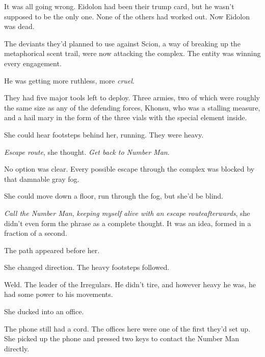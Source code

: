 It was all going wrong.  Eidolon had been their trump card, but he wasn't supposed to be the only one.  None of the others had worked out.  Now Eidolon was dead.



The deviants they'd planned to use against Scion, a way of breaking up the metaphorical scent trail, were now attacking the complex.  The entity was winning every engagement.



He was getting more ruthless, more \emph{cruel}.



They had five major tools left to deploy.  Three armies, two of which were roughly the same size as any of the defending forces, Khonsu, who was a stalling measure, and a hail mary in the form of the three vials with the special element inside.



She could hear footsteps behind her, running.  They were heavy.



\emph{Escape route}, she thought.  \emph{Get back to Number Man}.



No option was clear.  Every possible escape through the complex was blocked by that damnable gray fog.



She could move down a floor, run through the fog, but she'd be blind.



\emph{Call the Number Man}, \emph{keeping myself alive with an escape route}\emph{afterwards}, she didn't even form the phrase as a complete thought.  It was an idea, formed in a fraction of a second.



The path appeared before her.



She changed direction.  The heavy footsteps followed.



Weld.  The leader of the Irregulars.  He didn't tire, and however heavy he was, he had some power to his movements.



She ducked into an office.



The phone still had a cord.  The offices here were one of the first they'd set up.  She picked up the phone and pressed two keys to contact the Number Man directly.



